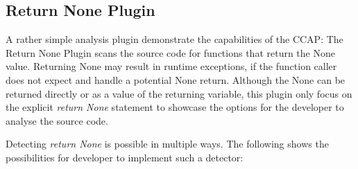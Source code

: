 \subsection{Return None Plugin}
A rather simple analysis plugin demonstrate the capabilities of the CCAP: The Return None Plugin scans the source code for functions that return the None value. Returning None may result in runtime exceptions, if the function caller does not expect and handle a potential None return. Although the None can be returned directly or as a value of the returning variable, this plugin only focus on the explicit \textit{return None} statement to showcase the options for the developer to analyse the source code.

Detecting \textit{return None} is possible in multiple ways. The following shows the possibilities for developer to implement such a detector:
